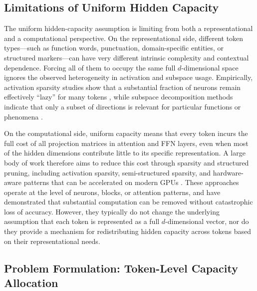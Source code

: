 \documentclass{article}
\theoremstyle{plain}
\theoremstyle{definition}
\theoremstyle{remark}
\begin{document}
\subsection{Limitations of Uniform Hidden Capacity}

The uniform hidden-capacity assumption is limiting from both a
representational and a computational perspective.
On the representational side, different token types---such as function
words, punctuation, domain-specific entities, or structured markers---can
have very different intrinsic complexity and contextual dependence.
Forcing all of them to occupy the same full $d$-dimensional space ignores
the observed heterogeneity in activation and subspace usage.
Empirically, activation sparsity studies show that a substantial fraction
of neurons remain effectively ``lazy'' for many tokens
\citep{li2023lazyneuron,liu2024trainingfreeactivationsparsitylarge}, while
subspace decomposition methods indicate that only a subset of directions is
relevant for particular functions or phenomena
\citep{mickus2022muppet,huang2025ndm,csreft2025representation}.

On the computational side, uniform capacity means that every token
incurs the full cost of all projection matrices in attention and FFN layers,
even when most of the hidden dimensions contribute little to its specific
representation.
A large body of work therefore aims to reduce this cost through sparsity and
structured pruning, including activation sparsity, semi-structured sparsity,
and hardware-aware patterns that can be accelerated on modern GPUs
\citep{farina2024sparsitysurvey,yu2023gpusqtlm,fang2024maskllm,zheng2024readme,shen2024searchefficientllm,liu2024efficientpostsparsification,li2024searchsurvey,liu2024sparsekernels,shen2024hardwareaware,yuan2025nativesparse,li2025hilbertlocal,xu2025xattention,xiao2025dbsa}.
These approaches operate at the level of neurons, blocks, or attention
patterns, and have demonstrated that substantial computation can be removed
without catastrophic loss of accuracy.
However, they typically do not change the underlying assumption that each
token is represented as a full $d$-dimensional vector, nor do they provide a
mechanism for redistributing hidden capacity across tokens based on their
representational needs.

\subsection{Problem Formulation: Token-Level Capacity Allocation}
\end{document}
